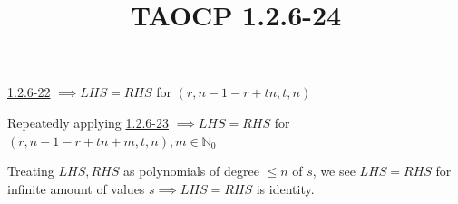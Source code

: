 \documentclass{article}
\title{TAOCP 1.2.6\mbox{-}24}
\begin{document}
\maketitle

\href{./1.2.6-22.pdf}{1.2.6\mbox{-}22} \( \implies LHS = RHS \) for \( (r,n-1-r+tn,t,n) \)

Repeatedly applying \href{./1.2.6-23.pdf}{1.2.6\mbox{-}23} \( \implies LHS = RHS \) for \( (r,n-1-r+tn + m,t,n), m \in \mathbb{N}_{0} \)

Treating \( LHS, RHS \) as polynomials of degree \( \leq n \) of \( s \), we see \( LHS = RHS \) for infinite amount of values \( s \implies LHS = RHS \) is identity.
\end{document}
